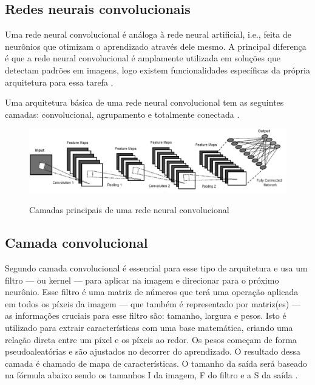 \subsection{Redes neurais convolucionais}
Uma rede neural convolucional é análoga à rede neural artificial, i.e., feita de neurônios que otimizam o aprendizado através dele mesmo. A principal diferença é que a rede neural convolucional é amplamente utilizada em soluções que detectam padrões em imagens, logo existem funcionalidades específicas da própria arquitetura para essa tarefa \cite{oshea2015introduction}. 

Uma arquitetura básica de uma rede neural convolucional tem as seguintes camadas: convolucional, agrupamento e totalmente conectada \cite{dp_overview}.

\begin{figure}[H]
	\caption{Camadas principais de uma rede neural convolucional}
	\centering %
	\includegraphics[width=15cm]{figures/arquitetura_cnn.png} %
	\label{fig:arquitetura_cnn}
\end{figure}

\subsection*{Camada convolucional}

Segundo  camada convolucional é essencial para esse tipo de arquitetura e usa um filtro — ou kernel — para aplicar na imagem e direcionar para o próximo neurônio. Esse filtro é uma matriz de números que terá uma operação aplicada em todos os píxeis da imagem — que também é representado por matriz(es) — as informações cruciais para esse filtro são: tamanho, largura e pesos. Isto é utilizado para extrair características com uma base matemática, criando uma relação direta entre um píxel e os píxeis ao redor. Os pesos começam de forma pseudoaleatórias e são ajustados no decorrer do aprendizado. O resultado dessa camada é chamado de mapa de características. O tamanho da saída será baseado na fórmula abaixo sendo os tamanhos I da imagem, F do filtro e a S da saída \cite{computation11030052}.


